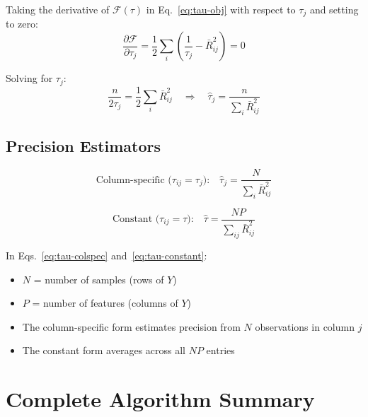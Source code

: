 \documentclass[11pt]{article}
\begin{document}
\begin{derivbox}
Taking the derivative of $\mathcal{F}(\tau)$ in Eq.~\eqref{eq:tau-obj}
with respect to $\tau_j$ and setting to zero:
\begin{equation}
  \frac{\partial\mathcal{F}}{\partial\tau_j}
  = \frac{1}{2}\sum_i\left(\frac{1}{\tau_j} - \bar{R}^2_{ij}\right) = 0
  \label{eq:tau-deriv}
\end{equation}

Solving for $\tau_j$:
\begin{equation}
  \frac{n}{2\tau_j} = \frac{1}{2}\sum_i\bar{R}^2_{ij}
  \quad\Rightarrow\quad
  \hat{\tau}_j = \frac{n}{\displaystyle\sum_i\bar{R}^2_{ij}}
  \label{eq:tau-solve}
\end{equation}
\end{derivbox}

\subsection{Precision Estimators}

\begin{equation}\label{eq:tau-colspec}
  \text{Column-specific (}\tau_{ij} = \tau_j\text{):}\quad
  \hat{\tau}_j = \frac{N}{\displaystyle\sum_i \bar{R}^2_{ij}}
\end{equation}

\begin{equation}\label{eq:tau-constant}
  \text{Constant (}\tau_{ij} = \tau\text{):}\quad
  \hat{\tau} = \frac{NP}{\displaystyle\sum_{ij}\bar{R}^2_{ij}}
\end{equation}

In Eqs.~\eqref{eq:tau-colspec} and~\eqref{eq:tau-constant}:
\begin{itemize}
  \item $N$ = number of samples (rows of $Y$)
  \item $P$ = number of features (columns of $Y$)
  \item The column-specific form estimates precision from $N$ observations
        in column $j$
  \item The constant form averages across all $NP$ entries
\end{itemize}

\section{Complete Algorithm Summary}\label{sec:algorithm}
\end{document}

